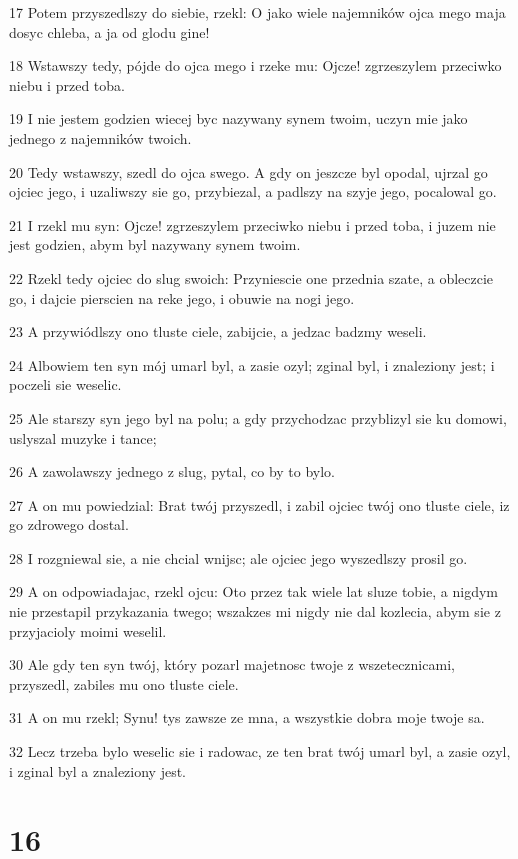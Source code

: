 \par 17 Potem przyszedlszy do siebie, rzekl: O jako wiele najemników ojca mego maja dosyc chleba, a ja od glodu gine!
\par 18 Wstawszy tedy, pójde do ojca mego i rzeke mu: Ojcze! zgrzeszylem przeciwko niebu i przed toba.
\par 19 I nie jestem godzien wiecej byc nazywany synem twoim, uczyn mie jako jednego z najemników twoich.
\par 20 Tedy wstawszy, szedl do ojca swego. A gdy on jeszcze byl opodal, ujrzal go ojciec jego, i uzaliwszy sie go, przybiezal, a padlszy na szyje jego, pocalowal go.
\par 21 I rzekl mu syn: Ojcze! zgrzeszylem przeciwko niebu i przed toba, i juzem nie jest godzien, abym byl nazywany synem twoim.
\par 22 Rzekl tedy ojciec do slug swoich: Przyniescie one przednia szate, a obleczcie go, i dajcie pierscien na reke jego, i obuwie na nogi jego.
\par 23 A przywiódlszy ono tluste ciele, zabijcie, a jedzac badzmy weseli.
\par 24 Albowiem ten syn mój umarl byl, a zasie ozyl; zginal byl, i znaleziony jest; i poczeli sie weselic.
\par 25 Ale starszy syn jego byl na polu; a gdy przychodzac przyblizyl sie ku domowi, uslyszal muzyke i tance;
\par 26 A zawolawszy jednego z slug, pytal, co by to bylo.
\par 27 A on mu powiedzial: Brat twój przyszedl, i zabil ojciec twój ono tluste ciele, iz go zdrowego dostal.
\par 28 I rozgniewal sie, a nie chcial wnijsc; ale ojciec jego wyszedlszy prosil go.
\par 29 A on odpowiadajac, rzekl ojcu: Oto przez tak wiele lat sluze tobie, a nigdym nie przestapil przykazania twego; wszakzes mi nigdy nie dal kozlecia, abym sie z przyjacioly moimi weselil.
\par 30 Ale gdy ten syn twój, który pozarl majetnosc twoje z wszetecznicami, przyszedl, zabiles mu ono tluste ciele.
\par 31 A on mu rzekl; Synu! tys zawsze ze mna, a wszystkie dobra moje twoje sa.
\par 32 Lecz trzeba bylo weselic sie i radowac, ze ten brat twój umarl byl, a zasie ozyl, i zginal byl a znaleziony jest.

\chapter{16}

